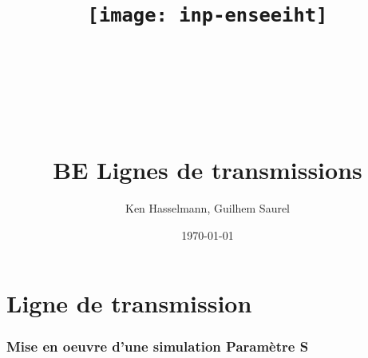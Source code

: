 \documentclass[10pt]{article}
\title{\texttt{[image: inp-enseeiht]} \\ ~ \\ ~ \\ ~ \\ ~ \\BE Lignes de transmissions}
\author{Ken Hasselmann, Guilhem Saurel}
\date{\today}
\begin{document}
 \begin{titlepage}
  \maketitle
  \tableofcontents
 \end{titlepage}

 \part{Ligne de transmission}
  \section{Mise en oeuvre d’une simulation Paramètre S}
\end{document}
